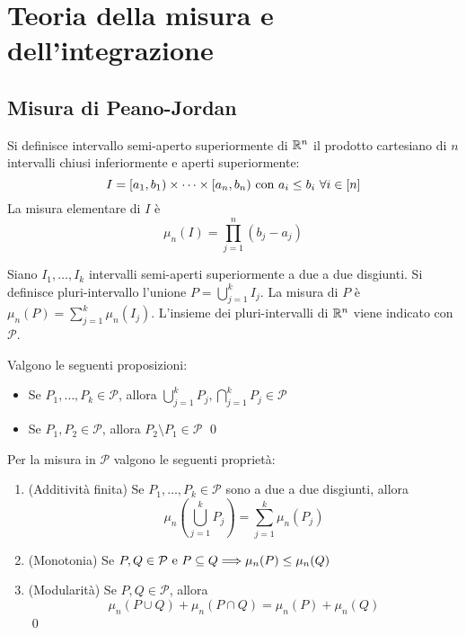 \chapter{Teoria della misura e dell'integrazione}\label{chap:peano_jordan}

\section{Misura di Peano-Jordan}

\begin{definition}
    Si definisce intervallo semi-aperto superiormente di $\mathbb{R}^n$ il prodotto cartesiano di $n$ intervalli chiusi inferiormente e aperti superiormente:
    $$
        I=[a_1,b_1)\times\cdots\times[a_n,b_n) \text{ con } a_i \leq b_i \ \forall i \in [n]
    $$
    La misura elementare di $I$ è
    $$
        \mu_n(I)=\prod_{j=1}^n(b_j-a_j)
    $$
\end{definition}

\begin{definition}
    Siano $I_1,\dots,I_k$ intervalli semi-aperti superiormente a due a due disgiunti. Si definisce pluri-intervallo l'unione $\displaystyle P=\bigcup_{j=1}^kI_j$. La misura di $P$ è $\mu_n(P)=\displaystyle \sum_{j=1}^k\mu_n(I_j)$. 
    L'insieme dei pluri-intervalli di $\mathbb{R}^n$ viene indicato con $\mathcal{P}$.
\end{definition}

\begin{lemma}
    Valgono le seguenti proposizioni:
    \begin{itemize}
        \item Se $P_1,\dots,P_k \in \mathcal{P}$, allora $\displaystyle \bigcup_{j=1}^k P_j, \bigcap_{j=1}^kP_j \in \mathcal{P}$
        \item Se $P_1,P_2 \in \mathcal{P}$, allora $P_2 \setminus P_1 \in \mathcal{P}$
        \qed
    \end{itemize}
\end{lemma}

\begin{theorem}
    Per la misura in $\mathcal{P}$ valgono le seguenti proprietà:
    \begin{enumerate}
        \item (Additività finita) Se $P_1,\dots,P_k \in \mathcal{P}$ sono a due a due disgiunti, allora
        $$
            \mu_n\left( \bigcup_{j=1}^k P_j \right) = \sum_{j=1}^k \mu_n(P_j)
        $$
        \item (Monotonia) Se $P, Q \in \mathcal{P} \text{ e } P \subseteq Q \Longrightarrow \mu_n(P)\leq \mu_n(Q)$
        \item (Modularità) Se $P,Q \in \mathcal{P}$, allora
        $$
            \mu_n(P\cup Q) + \mu_n (P \cap Q) = \mu_n (P) + \mu_n (Q)
        $$
        \qed
    \end{enumerate}
\end{theorem}

